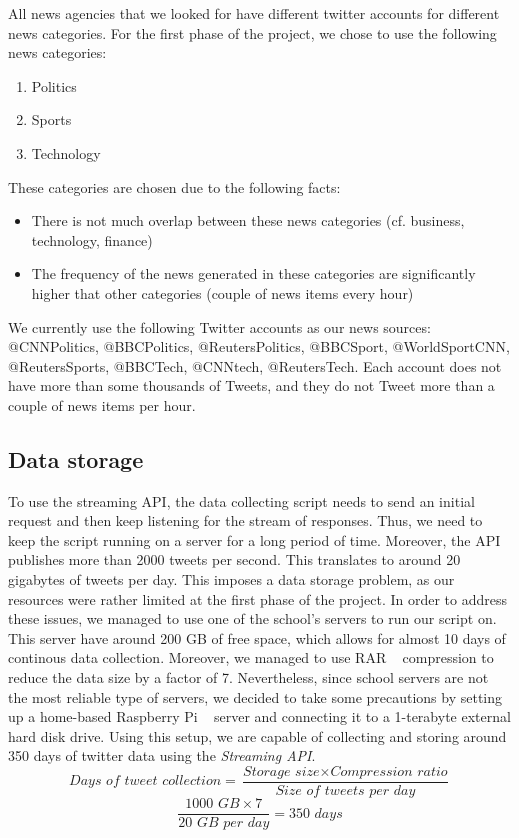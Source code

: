 \documentclass{llncs}
\begin{document}
All news agencies that we looked for have different twitter accounts for different news categories. For the first phase of the project, we chose to use the following news categories:

\begin{enumerate}
  \item Politics
  \item Sports
  \item Technology
\end{enumerate}

These categories are chosen due to the following facts:
\begin{itemize}
  \item There is not much overlap between these news categories (cf. business, technology, finance)
  \item The frequency of the news generated in these categories are significantly higher that other categories (couple of news items every hour)
\end{itemize}

We currently use the following Twitter accounts as our news sources: @CNNPolitics, @BBCPolitics, @ReutersPolitics, @BBCSport, @WorldSportCNN, @ReutersSports, @BBCTech, @CNNtech, @ReutersTech. Each account does not have more than some thousands of Tweets, and they do not Tweet more than a couple of news items per hour.

\subsection{Data storage}
To use the streaming API, the data collecting script needs to send an initial request and then keep listening for the stream of responses. Thus, we need to keep the script running on a server for a long period of time. Moreover, the API publishes more than 2000 tweets per second. This translates to around 20 gigabytes of tweets per day. This imposes a data storage problem, as our resources were rather limited at the first phase of the project. In order to address these issues, we managed to use one of the school's servers to run our script on. This server have around 200 GB of free space, which allows for almost 10 days of continous data collection. Moreover, we managed to use RAR ~\cite{wiki:RAR} compression to reduce the data size by a factor of 7. Nevertheless, since school servers are not the most reliable type of servers, we decided to take some precautions by setting up a home-based Raspberry Pi ~\cite{wiki:raspberrypi} server and connecting it to a 1-terabyte external hard disk drive. Using this setup, we are capable of collecting and storing around 350 days of twitter data using the \textit{Streaming API}.
\[\textit{Days of tweet collection}=\frac{\textit{Storage size}\times \textit{Compression ratio}} {\textit{Size of tweets per day}}\]
\[\frac{\textit{1000 GB} \times 7}{\textit{20 GB per day}}=\textit{350 days} \]
\end{document}
